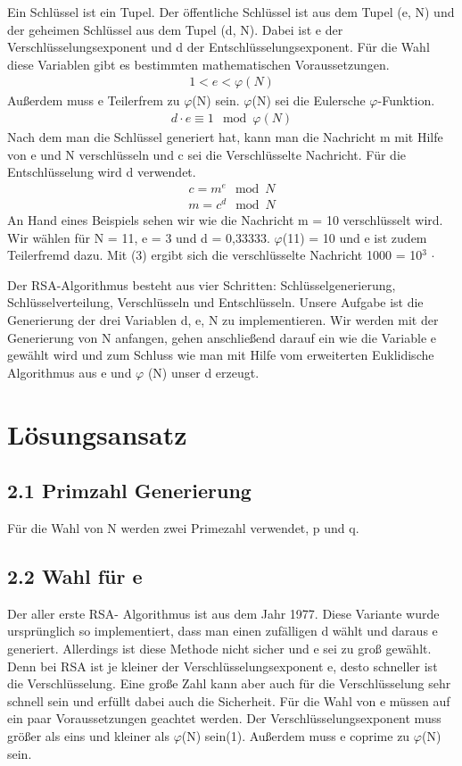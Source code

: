 \documentclass[course=asp]{aspdoc}
\begin{document}
Ein Schlüssel ist ein Tupel. Der öffentliche Schlüssel ist aus dem Tupel (e, N) und der geheimen Schlüssel aus dem Tupel (d, N). Dabei ist e der Verschlüsselungsexponent und d der Entschlüsselungsexponent. Für die Wahl diese Variablen gibt es bestimmten mathematischen Voraussetzungen. 
\begin{align}
1 < e < \varphi (N)
\end{align}
Außerdem muss e Teilerfrem zu $\varphi $(N) sein. $\varphi $(N) sei die Eulersche $\varphi $-Funktion.
\begin{align}
d \cdot e \equiv 1 \mod \varphi (N)
\end{align}
Nach dem man die Schlüssel generiert hat, kann man die Nachricht m mit Hilfe von e und N verschlüsseln und c sei die Verschlüsselte Nachricht. Für die Entschlüsselung wird d verwendet.
\begin{align}
c {=} m^e \mod N
\end{align} 
\begin{align}
m {=} c^d \mod N
\end{align} 
An Hand eines Beispiels sehen wir wie die Nachricht m = 10 verschlüsselt wird. Wir wählen für N = 11, e = 3 und d = 0,33333. $\varphi $(11) = 10 und e ist zudem Teilerfremd dazu. Mit (3) ergibt sich die verschlüsselte Nachricht 1000 = 10$^{3}$ $\cdot $ 


Der RSA-Algorithmus besteht aus vier Schritten: Schlüsselgenerierung, Schlüsselverteilung, Verschlüsseln und Entschlüsseln. Unsere Aufgabe ist die Generierung der drei Variablen d, e, N zu implementieren. Wir werden mit der Generierung von N anfangen, gehen anschließend darauf ein wie die Variable e gewählt wird und zum Schluss wie man mit Hilfe vom erweiterten Euklidische Algorithmus aus e und $\varphi $ (N) unser d erzeugt.

\section{Lösungsansatz}  
\subsection*{2.1 Primzahl Generierung }
Für die Wahl von N werden zwei Primezahl verwendet, p und q.

\subsection*{2.2 Wahl für e }
Der aller erste RSA- Algorithmus ist aus dem Jahr 1977. Diese Variante wurde ursprünglich so implementiert, dass man einen zufälligen d wählt und daraus e generiert. Allerdings ist diese Methode nicht sicher und e sei zu groß gewählt. Denn bei RSA ist je kleiner der Verschlüsselungsexponent e, desto schneller ist die Verschlüsselung. Eine große Zahl kann aber auch für die Verschlüsselung sehr schnell sein und erfüllt dabei auch die Sicherheit. Für die Wahl von e müssen auf ein paar Voraussetzungen geachtet werden. Der Verschlüsselungsexponent muss größer als eins und kleiner als $\varphi $(N) sein(1). Außerdem muss e coprime zu $\varphi $(N) sein.
\end{document}
